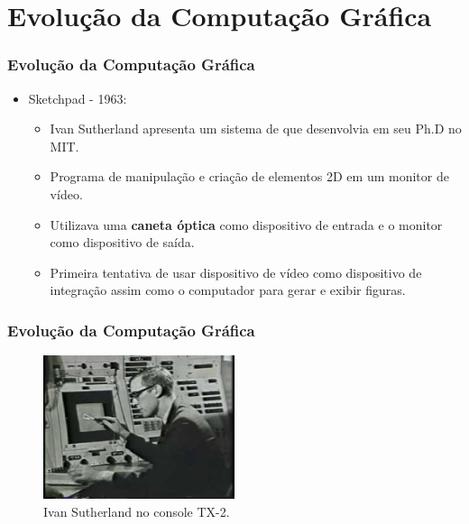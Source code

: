 \documentclass{beamer}
\begin{document}
\section{Evolução da Computação Gráfica}
\begin{frame}
\frametitle{Evolução da Computação Gráfica}

\begin{block}


\begin{itemize}
	\item<1-> Sketchpad - 1963:
	\begin{itemize}
		\item<1-> Ivan Sutherland apresenta um sistema de que desenvolvia em seu Ph.D no MIT.
		\item<1-> Programa de manipulação e criação de elementos 2D em um monitor de vídeo.
		\item<1-> Utilizava uma \textbf{caneta óptica} como dispositivo de entrada e o monitor como dispositivo de saída.
		
		\item<1-> Primeira tentativa de usar dispositivo de vídeo como dispositivo de integração assim como o computador para gerar e exibir figuras.
	\end{itemize}
	

\end{itemize}
\end{block}

\end{frame}



\begin{frame}
\frametitle{Evolução da Computação Gráfica}
	\begin{figure}[!h]
			\begin{center}
			\includegraphics[width=0.5\textwidth]{Figures/ivan}
			\caption{Ivan Sutherland no console TX-2.}\label{ivan}
			\end{center}
	\end{figure}
\end{frame}
\end{document}
